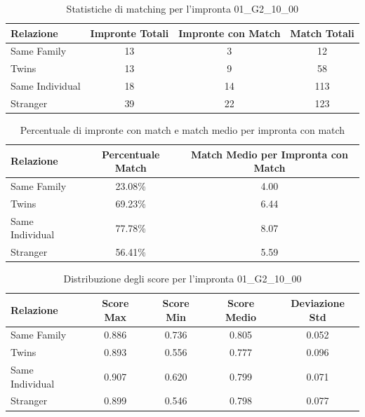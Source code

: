 \begin{table}[htbp]
\centering
\caption{Statistiche di matching per l'impronta 01\_G2\_10\_00}
\label{tab:results_01_G2_10_00}
\begin{tabular}{|l|c|c|c|}
\hline
\textbf{Relazione} & \textbf{Impronte Totali} & \textbf{Impronte con Match} & \textbf{Match Totali} \\
\hline
Same Family & 13 & 3 & 12 \\
\hline
Twins & 13 & 9 & 58 \\
\hline
Same Individual & 18 & 14 & 113 \\
\hline
Stranger & 39 & 22 & 123 \\
\hline
\end{tabular}
\end{table}


\begin{table}[htbp]
\centering
\caption{Percentuale di impronte con match e match medio per impronta con match}
\label{tab:match_percentage_01_G2_10_00}
\begin{tabular}{|l|c|c|}
\hline
\textbf{Relazione} & \textbf{Percentuale Match} & \textbf{Match Medio per Impronta con Match} \\
\hline
Same Family & 23.08\% & 4.00 \\
\hline
Twins & 69.23\% & 6.44 \\
\hline
Same Individual & 77.78\% & 8.07 \\
\hline
Stranger & 56.41\% & 5.59 \\
\hline
\end{tabular}
\end{table}


\begin{table}[htbp]
\centering
\caption{Distribuzione degli score per l'impronta 01\_G2\_10\_00}
\label{tab:scores_01_G2_10_00}
\begin{tabular}{|l|c|c|c|c|}
\hline
\textbf{Relazione} & \textbf{Score Max} & \textbf{Score Min} & \textbf{Score Medio} & \textbf{Deviazione Std} \\
\hline
Same Family & 0.886 & 0.736 & 0.805 & 0.052 \\
\hline
Twins & 0.893 & 0.556 & 0.777 & 0.096 \\
\hline
Same Individual & 0.907 & 0.620 & 0.799 & 0.071 \\
\hline
Stranger & 0.899 & 0.546 & 0.798 & 0.077 \\
\hline
\end{tabular}
\end{table}

